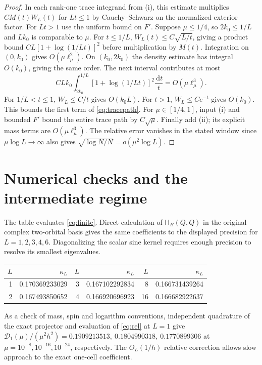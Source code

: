 \documentclass[11pt,letterpaper]{article}
\newcommand{\cD}{\mathcal D}
\newcommand{\cH}{\mathsf H}
\newcommand{\dd}{\,\mathrm d}
\newcommand{\lmu}{\ell_\mu}
\begin{document}
\begin{proof}
In each rank-one trace integrand from (i), this estimate multiplies \(CM(t)W_L(t)\) for \(Lt\le1\) by Cauchy--Schwarz on the normalized exterior factor. For \(Lt>1\) use the uniform bound on \(F'\). Suppose \(\mu\le1/4\), so \(2k_0\le1/L\) and \(Lk_0\) is comparable to \(\mu\). For \(t\le1/L\), \(W_L(t)\le C\sqrt{L/t}\), giving a product bound \(CL[1+\log(1/Lt)]^2\) before multiplication by \(M(t)\). Integration on \((0,k_0)\) gives \(O(\mu\lmu^2)\). On \((k_0,2k_0)\) the density estimate has integral \(O(k_0)\), giving the same order. The next interval contributes at most
\[
 CLk_0\int_{2k_0}^{1/L}[1+\log(1/Lt)]^2\frac{\dd t}{t}=O(\mu\lmu^3).
\]
For \(1/L<t\le1\), \(W_L\le C/t\) gives \(O(k_0 L)\). For \(t>1\), \(W_L\le Ce^{-t}\) gives \(O(k_0)\). This bounds the first term of \eqref{eq:tracepath}. For \(\mu\in[1/4,1]\), input (i) and bounded \(F'\) bound the entire trace path by \(C\sqrt\mu\). Finally add (ii); its explicit mass terms are \(O(\mu\lmu^3)\). The relative error vanishes in the stated window since \(\mu\log L\to\infty\) also gives \(\sqrt{\log N/N}=o(\mu^2\log L)\).
\end{proof}

\clearpage
\section{Numerical checks and the intermediate regime}
The table evaluates \eqref{eq:finite}. Direct calculation of \(\cH_B(Q,Q)\) in the original complex two-orbital basis gives the same coefficients to the displayed precision for \(L=1,2,3,4,6\). Diagonalizing the scalar sine kernel requires enough precision to resolve its smallest eigenvalues.
\begin{center}
\begin{tabular}{@{}rr@{\qquad}rr@{\qquad}rr@{}}
\toprule
\(L\)&\(\kappa_L\)&\(L\)&\(\kappa_L\)&\(L\)&\(\kappa_L\)\\ \midrule
1&0.170369233029&3&0.167102292834&8&0.166731439264\\
2&0.167493850652&4&0.166920696923&16&0.166682922637\\
\bottomrule
\end{tabular}
\end{center}
As a check of mass, spin and logarithm conventions, independent quadrature of the exact projector and evaluation of \eqref{eq:rel} at \(L=1\) give \(\cD_1(\mu)/(\mu^2h^2)=0.1909213513,\ 0.1804990318,\ 0.1770899306\) at \(\mu=10^{-8},10^{-16},10^{-24}\), respectively. The \(O_L(1/h)\) relative correction allows slow approach to the exact one-cell coefficient.
\end{document}
